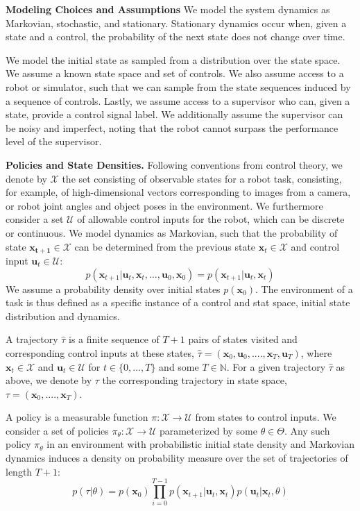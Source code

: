 \documentclass[10pt, conference]{ieeeconf}      %
\newcommand{\bu}{\mathbf{u}}
\newcommand{\bx}{\mathbf{x}}
\begin{document}
\noindent\textbf{Modeling Choices and Assumptions}  We model the system dynamics as Markovian, stochastic, and stationary. Stationary dynamics occur when, given a state and a control, the probability of the next state does not change over time. 

We model the initial state as sampled from a distribution over the state space.
We assume a known state space and set of controls. We also assume access to a robot or simulator, such that we  can sample from the state sequences induced by a sequence of controls.   Lastly, we assume access to a supervisor who can, given a state, provide a control signal label. We additionally assume the supervisor can be noisy and imperfect, noting that the robot cannot surpass the performance level of the supervisor. 



\noindent\textbf{Policies and State Densities.}
Following conventions from control theory, we denote by $\mathcal{X}$ the set consisting of observable states for a robot task, consisting, for example, of 
high-dimensional vectors corresponding to images from a camera, or robot joint angles and object poses in the environment.
We furthermore consider a set $\mathcal{U}$ of allowable control inputs for the robot, which can be discrete or
continuous. We model dynamics as Markovian, such that the probability of state $\mathbf{x_{t+1}}\in
\mathcal{X}$ can be determined from the previous state $\mathbf{x}_t\in\mathcal{X}$ and control input $\mathbf{u}_t\in
\mathcal{U}$: 
$$p(\bx_{t+1}|\bu_{t},\bx_{t}, \ldots, \bu_{0}, \bx_{0})=p(\bx_{t+1}|\bu_{t}, \bx_t)$$
We assume a probability density over initial states $p(\bx_0)$. The environment of a task is thus defined as a specific instance of a control and stat space, initial state distribution and dynamics. 



A trajectory $\hat{\tau}$ is a finite sequence of $T+1$ pairs of states visited and corresponding
control inputs at these states, $\hat{\tau} = (\mathbf{x}_0,\mathbf{u}_0, ...., \mathbf{x}_T,\mathbf{u}_T)$, where $\bx_t\in \mathcal{X}$
and $\bu_t\in \mathcal{U}$ for $t\in \{0, \ldots, T\}$ and some $T\in \mathbb{N}$.  
For a given trajectory $\hat{\tau}$ as above, we denote by ${\tau}$ the corresponding trajectory in state space,
${\tau} = (\bx_0,....,\bx_T)$. 


A policy is a measurable function $\pi: \mathcal{X} \to \mathcal{U}$ from states to control inputs. 
We consider a set of policies $\pi_{\theta}:\mathcal{X}\to \mathcal{U}$ parameterized by some $\theta\in \Theta$. Any such policy $\pi_{\theta}$ in an environment with probabilistic initial state density and Markovian dynamics
induces a density on probability measure over the set of  trajectories of length $T+1$: $$p(\tau | \theta)=
p(\bx_0)\prod_{i=0}^{T-1}p(\bx_{t+1}|\bu_t,\bx_t)p(\bu_t|\bx_t,\theta)$$
\end{document}
